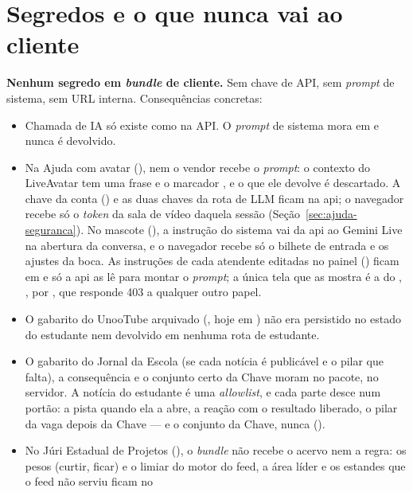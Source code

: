 \section{Segredos e o que nunca vai ao cliente}

\begin{regra}
\textbf{Nenhum segredo em \emph{bundle} de cliente.} Sem chave de API, sem
\emph{prompt} de sistema, sem URL interna. Consequências concretas:
\begin{itemize}
  \item Chamada de IA só existe como  na API. O
    \emph{prompt} de sistema mora em  e nunca é
    devolvido.
  \item Na Ajuda com avatar (), nem o vendor recebe o
    \emph{prompt}: o contexto do LiveAvatar tem uma frase e o marcador
    , e o  que ele devolve é descartado. A
    chave da conta () e as duas chaves da rota de LLM
    ficam na api; o navegador recebe só o \emph{token} da sala de vídeo daquela
    sessão (Seção~\ref{sec:ajuda-seguranca}). No mascote (), a
    instrução do sistema vai da api ao Gemini Live na abertura da conversa, e o
    navegador recebe só o bilhete de entrada e os ajustes da boca. As
    instruções de cada atendente editadas no painel () ficam em
     e só a api as lê para montar o \emph{prompt}; a
    única tela que as mostra é a do , , por
    , que responde 403 a qualquer
    outro papel.
  \item O gabarito do UnooTube arquivado (, hoje em
    ) não era persistido no estado do estudante nem
    devolvido em nenhuma rota de estudante.
  \item O gabarito do Jornal da Escola (se cada notícia é publicável e o pilar
    que falta), a consequência e o conjunto certo da Chave moram no pacote, no
    servidor. A notícia do estudante é uma \emph{allowlist}, e cada parte
    desce num portão: a pista quando ela a abre, a reação com o resultado
    liberado, o pilar da vaga depois da Chave --- e o conjunto da Chave, nunca
    ().
  \item No Júri Estadual de Projetos (), o \emph{bundle} não
    recebe o acervo nem a regra: os pesos (curtir, ficar) e o limiar do
    motor do feed, a área líder e os estandes que o feed não serviu ficam no

\end{itemize}
\end{regra}
